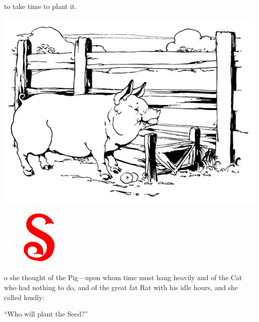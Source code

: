 \documentclass[letterpaper, 10pt, openany]{memoir}
\begin{document}
\vspace{\onelineskip}

to take time to plant it.

\newpage
\begin{center}
	\includegraphics[width=\textwidth]{image_012_2.jpg}
\end{center}

\vspace{\onelineskip}

\begin{figure}
	\vspace{-\onelineskip}
	\includegraphics[width=0.15\textwidth]{image_012_1.jpg}
\end{figure}

o she thought of the Pig—upon whom time must hang heavily and of the Cat
who had nothing to do, and of the great fat Rat with his idle hours, and
she called loudly:

\newpage
``Who will plant the Seed?''
\end{document}
